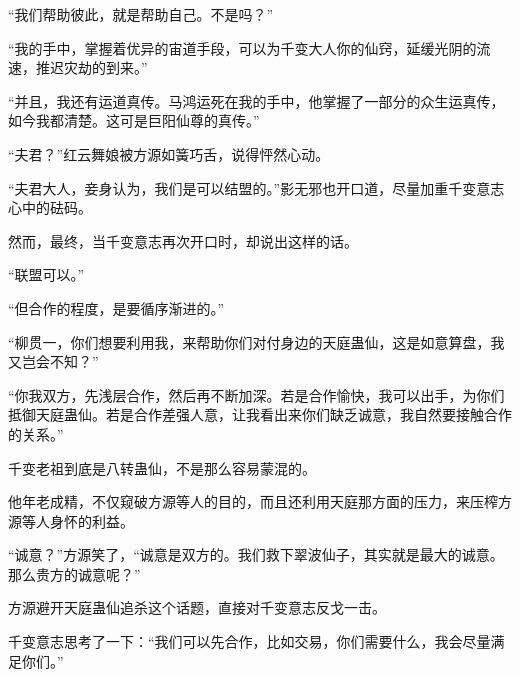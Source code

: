 \begin{this_body}
“我们帮助彼此，就是帮助自己。不是吗？”

“我的手中，掌握着优异的宙道手段，可以为千变大人你的仙窍，延缓光阴的流速，推迟灾劫的到来。”

“并且，我还有运道真传。马鸿运死在我的手中，他掌握了一部分的众生运真传，如今我都清楚。这可是巨阳仙尊的真传。”

“夫君？”红云舞娘被方源如簧巧舌，说得怦然心动。

“夫君大人，妾身认为，我们是可以结盟的。”影无邪也开口道，尽量加重千变意志心中的砝码。

然而，最终，当千变意志再次开口时，却说出这样的话。

“联盟可以。”

“但合作的程度，是要循序渐进的。”

“柳贯一，你们想要利用我，来帮助你们对付身边的天庭蛊仙，这是如意算盘，我又岂会不知？”

“你我双方，先浅层合作，然后再不断加深。若是合作愉快，我可以出手，为你们抵御天庭蛊仙。若是合作差强人意，让我看出来你们缺乏诚意，我自然要接触合作的关系。”

千变老祖到底是八转蛊仙，不是那么容易蒙混的。

他年老成精，不仅窥破方源等人的目的，而且还利用天庭那方面的压力，来压榨方源等人身怀的利益。

“诚意？”方源笑了，“诚意是双方的。我们救下翠波仙子，其实就是最大的诚意。那么贵方的诚意呢？”

方源避开天庭蛊仙追杀这个话题，直接对千变意志反戈一击。

千变意志思考了一下：“我们可以先合作，比如交易，你们需要什么，我会尽量满足你们。”

\end{this_body}

